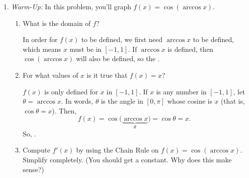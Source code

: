 \documentclass[main]{subfiles}
\begin{document}
\begin{enumerate}

\item 
\textit{Warm-Up:} In this problem, you'll graph $f(x) = \cos(\arccos x)$.
  \begin{enumerate}
  \item
    \begin{problem}[0.25in]
      What is the domain of $f$?
    \end{problem}

    \begin{solution}
      In order for $f(x)$ to be defined, we first need $\arccos x$ to be
      defined, which means $x$ must be in $[-1, 1]$.  If $\arccos x$ is
      defined, then $\cos(\arccos x)$ will also be defined, so the
      .
    \end{solution}

  \item
    \begin{problem}[1in]
      For what values of $x$ is it true that $f(x) = x$?
    \end{problem}

    \begin{solution}
      $f(x)$ is only defined for $x$ in $[-1, 1]$.  If $x$ is any number
      in $[-1, 1]$, let $\theta = \arccos x$.  In words, $\theta$ is the
      angle in $[0, \pi]$ whose cosine is $x$ (that is, $\cos \theta =
      x$).  Then, \[f(x) = \cos \Big( \underbrace{\arccos x}_\theta \Big)
      = \cos \theta = x.\] So, .
    \end{solution}

  \item
    \begin{problem}[\vfill]
      Compute $f'(x)$ by using the Chain Rule on $f(x) = \cos(\arccos x)$. Simplify completely. (You should get a constant. 
      Why does this make sense?)
    \end{problem}


\end{enumerate}
\end{enumerate}
\end{document}
